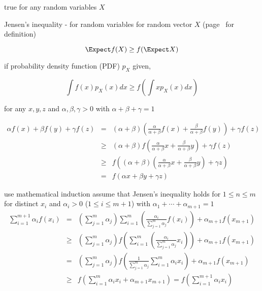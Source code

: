 \documentclass[17pt,landscape]{foils}
\begin{document}
{	\vitem true for any random variables $X$
\eit

\vfill
\begin{myinequality}{Jensen's inequality - for random variables}%
	for random vector $X$ (page~\pageref{page:random-variables} for definition)

	\[
		\Expect f(X) \geq f(\Expect X)
	\]

	if probability density function (PDF) $p_X$ given,

	\[
		\int f(x) p_X(x) dx \geq f\left(\int x p_X(x) dx\right)
	\]
\end{myinequality}
\vfill



\bit
	\item for any $x,y,z$ and $\alpha,\beta,\gamma>0$ with $\alpha + \beta + \gamma = 1$

	\begin{eqnarray*}
			\alpha f(x) + \beta f(y) + \gamma f(z)
		&=&
			(\alpha+\beta)\left(\frac{\alpha}{\alpha+\beta} f(x) + \frac{\beta}{\alpha + \beta} f(y)\right) + \gamma f(z)
		\\
		&\geq&
			(\alpha+\beta)f\left(\frac{\alpha}{\alpha+\beta} x + \frac{\beta}{\alpha + \beta} y\right) + \gamma f(z)
		\\
		&\geq&
			f\left((\alpha+\beta)\left(\frac{\alpha}{\alpha+\beta} x + \frac{\beta}{\alpha + \beta} y\right) + \gamma z \right)
		\\
		&=&
			f(\alpha x + \beta y + \gamma z )
	\end{eqnarray*}
\eit



\bit
\item
	use mathematical induction
	\bit
	\vitem
		assume that Jensen's inequality holds for $1\leq n\leq m$
	\vitem
		for distinct $x_i$ and $\alpha_i>0$ ($1\leq i\leq m+1$) with $\alpha_1 + \cdots + \alpha_{m+1} = 1$
		\begin{eqnarray*}
				\sum^{m+1}_{i=1} \alpha_i f(x_i)
			&=&
				\left(\sum^m_{j=1} \alpha_j\right) \sum^m_{i=1} \left(\frac{\alpha_i}{\sum^m_{j=1} \alpha_j} f(x_i)\right) + \alpha_{m+1} f(x_{m+1})
			\\
			&\geq&
				\left(\sum^m_{j=1} \alpha_j\right) f\left(\sum^m_{i=1} \left(\frac{\alpha_i}{\sum^m_{j=1} \alpha_j} x_i\right)\right) + \alpha_{m+1} f(x_{m+1})
			\\
			&=&
				\left(\sum^m_{j=1} \alpha_j\right) f\left(\frac{1}{\sum^m_{j=1} \alpha_j}\sum^m_{i=1} {\alpha_i}{} x_i\right) + \alpha_{m+1} f(x_{m+1})
			\\
			&\geq&
				f\left( \sum^m_{i=1} \alpha_i x_i + \alpha_{m+1} x_{m+1}\right)
			=
				f\left( \sum^{m+1}_{i=1} \alpha_i x_i \right)
		\end{eqnarray*}
	\eit
\eit


}
\end{document}
